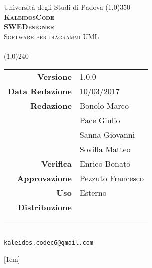 \documentclass[a4paper,12pt]{article}
\author{KaleidosCode}
\date{10/03/2017}	%
\date{\today}
\begin{document}
	\begin{titlepage}
		\centering Università degli Studi di Padova
		\line(1,0){350}\\
		\vspace{0.4cm}
		{\bfseries\scshape\LARGE KaleidosCode\\}
		\vspace{0.4cm}
		{\bfseries\scshape\LARGE SWEDesigner\\}
		{\scshape\Large Software per diagrammi UML\\}
		\vspace{1cm}
		{\scshape\Large \glossarioi\ \\}		%
		\vspace{1.4cm}
		\logo
		\vspace{1.2cm}
		\line(1,0){240}\\
		\begin{tabular}{r|l}
			{\hfill \textbf{Versione}} 			& 1.0.0\\
			{\hfill \textbf{Data Redazione}} 	& 10/03/2017\\	%
			{\hfill \textbf{Redazione}} 		& Bonolo Marco\\ & Pace Giulio\\ & Sanna Giovanni\\ & Sovilla Matteo\\
			{\hfill \textbf{Verifica}} 			& Enrico Bonato\\
			{\hfill \textbf{Approvazione}} 		& Pezzuto Francesco\\
			{\hfill \textbf{Uso}} 				& Esterno\\
			{\hfill \textbf{Distribuzione}} 	& \vardanega \\ & \cardin \\ & \proponente\\
		\end{tabular}\\
		\vspace{2cm}
		\texttt{kaleidos.codec6@gmail.com}
	\end{titlepage}
	
	\pagestyle{myfront}
	\newpage
		
	\newpage
		[1em]{}{\bfseries\fontsize{0.8em}{0.8em}}{}{\contentspage}
		\tableofcontents
	\pagestyle{mymain}
	\newpage
		\titleformat{\section}[block]{\bfseries\fontsize{20pt}{20pt}\selectfont}{}{-0.8em}{}
		\printglossary[style=myaltlistgroup, title=, toctitle=Glossario dei termini]
		\glsaddall

	\label{LastPage}
\end{document}
